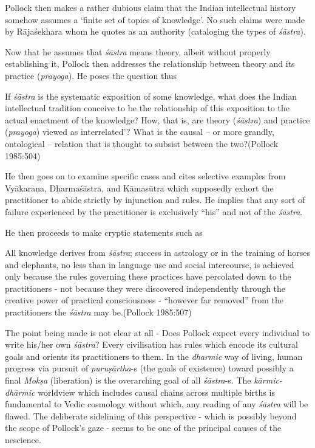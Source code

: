 Pollock then makes a rather dubious claim that the Indian intellectual history somehow assumes a `finite set of topics of knowledge'. No such claims were made by Rājaśekhara whom he quotes as an authority (cataloging the types of {\sl śāstra}).

Now that he assumes that {\sl śāstra} means theory, albeit without properly establishing it, Pollock then addresses the relationship between theory and its practice ({\sl prayoga}). He poses the question thus 
\begin{myquote}
If {\sl śāstra} is the systematic exposition of some knowledge, what does the Indian intellectual tradition conceive to be the relationship of this exposition to the actual enactment of the knowledge? How, that is, are theory ({\sl śāstra}) and practice ({\sl prayoga}) viewed as interrelated'? What is the causal -- or more grandly, ontological -- relation that is thought to subsist between the two?\hfill (Pollock 1985:504)
\end{myquote}

He then goes on to examine specific cases and cites selective examples from Vyākaraṇa, Dharmaśāstra, and Kāmasūtra which supposedly exhort the practitioner to abide strictly by injunction and rules. He implies that any sort of failure experienced by the practitioner is exclusively ``his'' and not of the {\sl śāstra}.

He then proceeds to make cryptic statements such as 
\begin{myquote}
All knowledge derives from {\sl śāstra}; success in astrology or in the training of horses and elephants, no less than in language use and social intercourse, is achieved only because the rules governing these practices have percolated down to the practitioners - not because they were discovered independently through the creative power of practical consciousness - ``however far removed'' from the practitioners the {\sl śāstra} may be.\hfill (Pollock 1985:507)
\end{myquote}

The point being made is not clear at all - Does Pollock expect every individual to write his/her own {\sl śāstra}? Every civilisation has rules which encode its cultural goals and orients its practitioners to them. In the {\sl dharmic} way of living, human progress via pursuit of {\sl puruṣārtha}-s (the goals of existence) toward possibly a final {\sl Mokṣa} (liberation) is the overarching goal of all {\sl śāstra}-s. The {\sl kārmic-dhārmic} worldview which includes causal chains across multiple births is fundamental to Vedic cosmology without which, any reading of any {\sl śāstra} will be flawed. The deliberate sidelining of this perspective - which is possibly beyond the scope of Pollock's gaze - seems to be one of the principal causes of the nescience.

